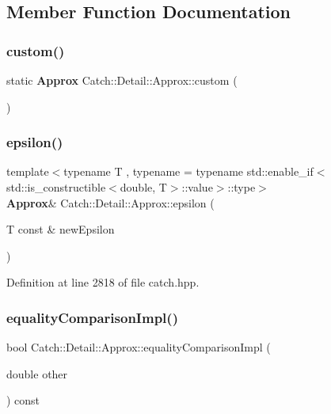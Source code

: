 \subsection{Member Function Documentation}
\mbox{\label{class_catch_1_1_detail_1_1_approx_aaf86dc0ee92272ac2d9839197a07951d}} 
\subsubsection{custom()}
{\footnotesize\ttfamily static \textbf{ Approx} Catch\+::\+Detail\+::\+Approx\+::custom (\begin{DoxyParamCaption}{ }\end{DoxyParamCaption})\hspace{0.3cm}{\ttfamily [static]}}

\mbox{\label{class_catch_1_1_detail_1_1_approx_acd26adba86a066b9f40dad467f23bc85}} 
\subsubsection{epsilon()}
{\footnotesize\ttfamily template$<$typename T , typename  = typename std\+::enable\+\_\+if$<$std\+::is\+\_\+constructible$<$double, T$>$\+::value$>$\+::type$>$ \\
\textbf{ Approx}\& Catch\+::\+Detail\+::\+Approx\+::epsilon (\begin{DoxyParamCaption}\item[{T const \&}]{new\+Epsilon }\end{DoxyParamCaption})\hspace{0.3cm}{\ttfamily [inline]}}



Definition at line 2818 of file catch.\+hpp.

\mbox{\label{class_catch_1_1_detail_1_1_approx_af53c48227a7b654da58adeb1d360b715}} 
\subsubsection{equalityComparisonImpl()}
{\footnotesize\ttfamily bool Catch\+::\+Detail\+::\+Approx\+::equality\+Comparison\+Impl (\begin{DoxyParamCaption}\item[{double}]{other }\end{DoxyParamCaption}) const\hspace{0.3cm}{\ttfamily [private]}}

